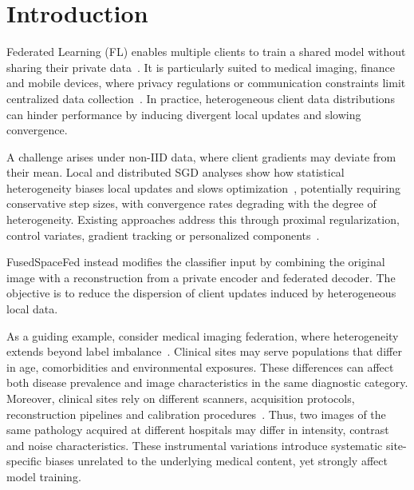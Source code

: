 \documentclass[twoside]{article}
\newif\ifcoauthorreview
\newcommand{\coauthordiffcolor}{\ifcoauthorreview\color[RGB]{0,70,140}\else\color[RGB]{0,0,0}\fi}
\newenvironment{coauthorchange}{\par\begingroup\coauthordiffcolor}{\par\endgroup}
\theoremstyle{thmstyleone}%
\theoremstyle{thmstyletwo}%
\theoremstyle{thmstylethree}%
\begin{document}
\begin{coauthorchange}
\section{Introduction}

Federated Learning (FL) enables multiple clients to train a
shared model without sharing their private data~\cite{mcmahan2017communication}.
It is particularly suited to medical imaging, finance and mobile devices,
where privacy regulations or communication constraints limit centralized
data collection~\cite{kairouz2021advances}. In practice, heterogeneous
client data distributions can hinder performance by inducing divergent local
updates and slowing convergence.

A challenge arises under non-IID data, where client gradients
may deviate from their mean. Local and distributed SGD analyses show how
statistical heterogeneity biases local updates and slows
optimization~\cite{stich2019localsgd,woodworth2020minibatch}, potentially
requiring conservative step sizes, with convergence rates degrading
with the degree of heterogeneity. Existing approaches address this through proximal regularization, control variates, gradient tracking or personalized components~\cite{li2018federated,karimireddy2020scaffold,haddadpour2021compression,arivazhagan2019fedper,collins2021fedrep,li2021ditto,li2021fedbn}.

FusedSpaceFed instead modifies the classifier input by combining the original
image with a reconstruction from a private encoder and federated decoder.
The objective is to
reduce the dispersion of client updates induced by
heterogeneous local data.

As a guiding example, consider medical imaging
federation, where heterogeneity extends beyond label imbalance~\cite{sheller2018multi,guan2024federated}. Clinical sites may serve populations that differ in age, comorbidities and environmental exposures. These differences can affect both disease prevalence and image characteristics in the same diagnostic category. Moreover, clinical sites
rely on different scanners, acquisition protocols, reconstruction pipelines and
calibration procedures~\cite{glocker2019machine,dinsdale2021unlearning}.
Thus, two images of the same pathology acquired at different hospitals
may differ in intensity, contrast and noise
characteristics. These instrumental variations introduce systematic
site-specific biases unrelated to the underlying medical content,
yet strongly affect model training.


\end{coauthorchange}
\end{document}
